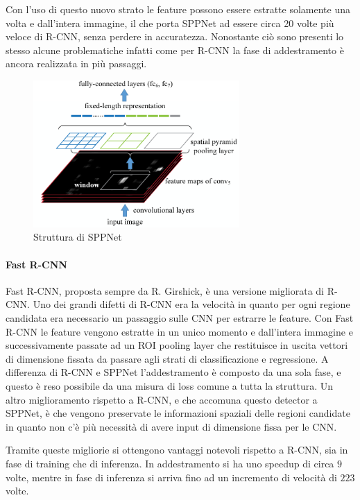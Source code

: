Con l'uso di questo nuovo strato le feature possono essere estratte solamente una volta e dall'intera immagine, il che porta \ac{SPPNet} ad essere circa 20 volte più veloce di R-CNN, senza perdere in accuratezza. 
Nonostante ciò sono presenti lo stesso alcune problematiche infatti come per R-CNN la fase di addestramento è ancora realizzata in più passaggi.
\begin{figure}[]
    \centering
    \includegraphics[width=0.7\textwidth]{images/spm_det.pdf}
    \caption{Struttura di \ac{SPPNet} \cite{he2015spatial}}
    \label{fig:spnnet_structure}
\end{figure}
\paragraph{Fast R-CNN}
Fast R-CNN, proposta sempre da R. Girshick, \cite{girshick2015fast} è una versione migliorata di R-CNN. Uno dei grandi difetti di R-CNN era la velocità in quanto per ogni regione candidata era necessario un passaggio sulle \ac{CNN} per estrarre le feature. 
Con Fast R-CNN le feature vengono estratte in un unico momento e dall'intera immagine e successivamente passate ad  un \ac{ROI} pooling layer che restituisce in uscita vettori di dimensione fissata da passare agli strati di classificazione e regressione. 
A differenza di R-CNN e \ac{SPPNet} l'addestramento è composto da una sola fase, e questo è reso possibile da una misura di loss comune a tutta la struttura. 
Un altro miglioramento rispetto a R-CNN, e che accomuna questo detector a \ac{SPPNet}, è che vengono preservate le informazioni spaziali delle regioni candidate in quanto non c'è più necessità di avere input di dimensione fissa per le \ac{CNN}. 

Tramite queste migliorie si ottengono vantaggi notevoli rispetto a R-CNN, sia in fase di training che di inferenza. In addestramento si ha uno speedup di circa $9$ volte, mentre in fase di inferenza si arriva fino ad un incremento di velocità di $223$ volte. 
